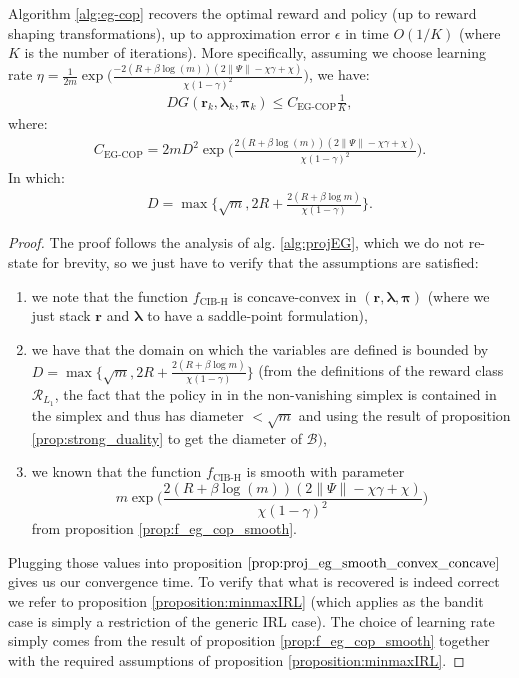   \begin{theorem}
    \label{thm:EG_COP_convergence}
    Algorithm \ref{alg:eg-cop} recovers the optimal reward and policy (up to reward shaping transformations), up to approximation error $\epsilon$ in time $O(1/K)$ (where $K$ is the number of iterations). More specifically, assuming we choose learning rate $\eta = \frac{1}{2m}  \exp \Big(\frac{-2\left(R + \beta \log{\left(m \right)}\right) \left(2  \|\Psi\| - \chi \gamma + \chi\right)}{\chi \left(1- \gamma\right)^{2}} \Big)$, we have: 
    \begin{align*}
        DG(\bm{r}_k,\bm{\lambda}_k,\bm{\pi}_k) 
        \leq C_\text{EG-COP} \frac{1}{K},
    \end{align*}
    where:
    \begin{align*}
        C_\text{EG-COP} = 2 m D^2  \exp \Bigg(\frac{2\left(R + \beta \log{\left(m \right)}\right) \left(2  \|\Psi\| - \chi \gamma + \chi\right)}{\chi \left(1- \gamma\right)^{2}} \Bigg).
    \end{align*}
    In which:
    \begin{align*}
        D = \max\Big\{
            \sqrt{m},
            2R 
            +\frac{2(R +\beta \log m)}{\chi (1-\gamma)} 
            \Big\}.
    \end{align*}
  \end{theorem}
\begin{proof}
    The proof follows the analysis of alg. \ref{alg:projEG}, which we do not re-state for brevity, so we just have to verify that the assumptions are satisfied:
    \begin{enumerate}
        \item we note that the function $f_\text{CIB-H}$ is concave-convex in $(\bm{r},\bm{\lambda},\bm{\pi})$ (where we just stack $\bm{r}$ and $\bm{\lambda}$ to have a saddle-point formulation),
        \item we have that the domain on which the variables are defined is bounded by $D= \max\Big\{\sqrt{m},2R +\frac{2(R +\beta \log m)}{\chi (1-\gamma)} \Big\} $ (from the definitions of the reward class $\mathcal{R}_{L_1}$, the fact that the policy in in the non-vanishing simplex is contained in the simplex and thus has diameter $<\sqrt{m}$ and using the result of proposition \ref{prop:strong_duality} to get the diameter of $\mathcal{B})$,
        \item we known that the function $f_\text{CIB-H}$ is smooth with parameter \[m  \exp \Big(\frac{2\left(R + \beta \log{\left(m \right)}\right) \left(2  \|\Psi\| - \chi \gamma + \chi\right)}{\chi \left(1- \gamma\right)^{2}} \Big)\] from proposition \ref{prop:f_eg_cop_smooth}.
    \end{enumerate}
    Plugging those values into proposition $\ref{prop:proj_eg_smooth_convex_concave}$ gives us our convergence time. To verify that what is recovered is indeed correct we refer to proposition \ref{proposition:minmaxIRL} (which applies as the bandit case is simply a restriction of the generic IRL case). The choice of learning rate simply comes from the result of proposition \ref{prop:f_eg_cop_smooth} together with the required assumptions of proposition \ref{proposition:minmaxIRL}.
\end{proof}
